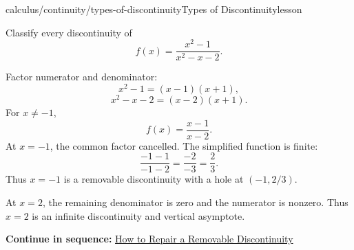 \documentclass[11pt,openany]{book}
\theoremstyle{bgplain}
\newcounter{bgexample}[chapter]
\newcommand{\webnext}[2]{%
  \par\addvspace{1.2em}\noindent{\color{BGLine}\rule{\textwidth}{0.35pt}}\par\smallskip
  {\small\color{BGGray}\textbf{Continue in sequence:} \hyperlink{web:#1}{#2}}\par
}
\begin{document}
\begin{webpage}{calculus/continuity/types-of-discontinuity}{Types of Discontinuity}{lesson}
\begin{bgexample}[title={Classify a rational function's discontinuities}]
Classify every discontinuity of
\[
  f(x)=\frac{x^2-1}{x^2-x-2}.
\]

\begin{bgsolution}
Factor numerator and denominator:
\[
  x^2-1=(x-1)(x+1),
\]
\[
  x^2-x-2=(x-2)(x+1).
\]
For \(x\ne-1\),
\[
  f(x)=\frac{x-1}{x-2}.
\]
At \(x=-1\), the common factor cancelled. The simplified function is finite:
\[
  \frac{-1-1}{-1-2}=\frac{-2}{-3}=\frac23.
\]
Thus \(x=-1\) is a removable discontinuity with a hole at \((-1,2/3)\).

At \(x=2\), the remaining denominator is zero and the numerator is nonzero. Thus \(x=2\) is an infinite discontinuity and vertical asymptote.
\end{bgsolution}
\end{bgexample}
\webnext{calculus/continuity/repair-removable-discontinuity}{How to Repair a Removable Discontinuity}
\end{webpage}
\end{document}
